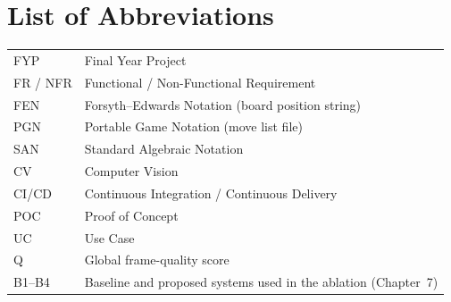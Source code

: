 \chapter*{List of Abbreviations}
\begin{tabular}{p{}p{}}
FYP & Final Year Project\\
FR / NFR & Functional / Non-Functional Requirement\\
FEN & Forsyth--Edwards Notation (board position string)\\
PGN & Portable Game Notation (move list file)\\
SAN & Standard Algebraic Notation\\
CV & Computer Vision\\
CI/CD & Continuous Integration / Continuous Delivery\\
POC & Proof of Concept\\
UC & Use Case\\
Q & Global frame-quality score\\
B1--B4 & Baseline and proposed systems used in the ablation (Chapter~7)\\
\end{tabular}
